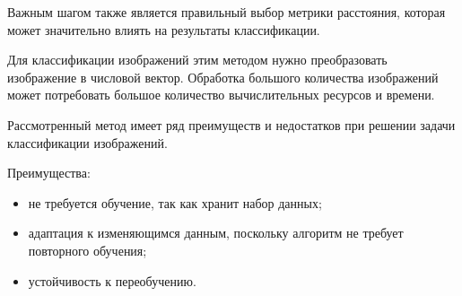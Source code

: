 Важным шагом также является правильный выбор метрики расстояния, которая может значительно влиять на результаты классификации.

Для классификации изображений этим методом нужно преобразовать\\ изображение в числовой вектор. Обработка большого количества изображений может потребовать большое количество вычислительных ресурсов и времени.








Рассмотренный метод имеет ряд преимуществ и недостатков при решении задачи классификации изображений.

Преимущества:
\begin{itemize}[leftmargin=1.6\parindent, label*=---]
	\item не требуется обучение, так как хранит набор данных;
	\item адаптация к изменяющимся данным, поскольку алгоритм не требует повторного обучения;
	\item устойчивость к переобучению.
\end{itemize}

